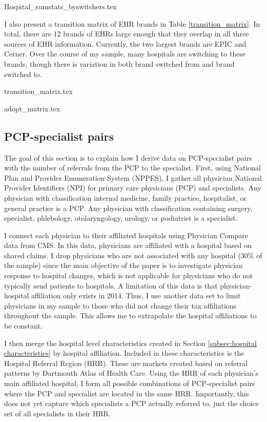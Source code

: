 \documentclass[12pt]{article}
\begin{document}
    {Hospital_sumstats_byswitchers.tex}

    I also present a transition matrix of EHR brands in Table \ref{transition_matrix}. In total, there are 12 brands of EHRs large enough that they overlap in all three sources of EHR information. Currently, the two largest brands are EPIC and Cerner. Over the course of my sample, many hospitals are switching to these brands, though there is variation in both brand switched from and brand switched to. 

    {transition_matrix.tex}

    {adopt_matrix.tex}

    \subsection{PCP-specialist pairs}

    The goal of this section is to explain how I derive data on PCP-specialist pairs with the number of referrals from the PCP to the specialist. First, using National Plan and Provider Enumeration System (NPPES), I gather all physician National Provider Identifiers (NPI) for primary care physicians (PCP) and specialists. Any physician with classification internal medicine, family practice, hospitalist, or general practice is a PCP. Any physician with classification containing surgery, specialist, phlebology, otolaryngology, urology, or podiatrist is a specialist. 

    I connect each physician to their affiliated hospitals using Physician Compare data from CMS. In this data, physicians are affiliated with a hospital based on shared claims. I drop physicians who are not associated with any hospital (30\% of the sample) since the main objective of the paper is to investigate physician response to hospital changes, which is not applicable for physicians who do not typically send patients to hospitals. A limitation of this data is that physician-hospital affiliation only exists in 2014. Thus, I use another data set to limit physicians in my sample to those who did not change their tax affiliations throughout the sample. This allows me to extrapolate the hospital affiliations to be constant. 

    I then merge the hospital level characteristics created in Section \ref{subsec:hospital characteristics} by hospital affiliation. Included in these characteristics is the Hospital Referral Region (HRR). These are markets created based on referral patterns by Dartmouth Atlas of Health Care. Using the HRR of each physician's main affiliated hospital, I form all possible combinations of PCP-specialist pairs where the PCP and specialist are located in the same HRR. Importantly, this does not yet capture which specialists a PCP actually referred to, just the choice set of all specialists in their HRR. 
\end{document}
